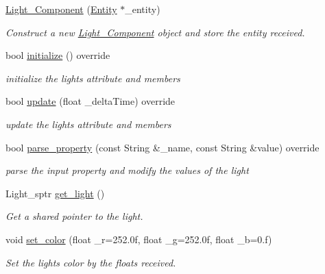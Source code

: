 \begin{DoxyCompactItemize}
\item 
\mbox{\hyperlink{classbanita_1_1_light___component_ab3a24d9ee4cd5d3598588dabef05375b}{Light\+\_\+\+Component}} (\mbox{\hyperlink{classbanita_1_1_entity}{Entity}} $\ast$\+\_\+entity)
\begin{DoxyCompactList}\small\item\em Construct a new \mbox{\hyperlink{classbanita_1_1_light___component}{Light\+\_\+\+Component}} object and store the entity received. \end{DoxyCompactList}\item 
bool \mbox{\hyperlink{classbanita_1_1_light___component_a2afec04726df91aee59837fa1481d361}{initialize}} () override
\begin{DoxyCompactList}\small\item\em initialize the light\textquotesingle{}s attribute and members \end{DoxyCompactList}\item 
bool \mbox{\hyperlink{classbanita_1_1_light___component_a1cba9ef2cb6b798623899ad94f68df9f}{update}} (float \+\_\+delta\+Time) override
\begin{DoxyCompactList}\small\item\em update the light\textquotesingle{}s attribute and members \end{DoxyCompactList}\item 
bool \mbox{\hyperlink{classbanita_1_1_light___component_aa808026256f8f1050a1a90cc3b6a0602}{parse\+\_\+property}} (const String \&\+\_\+name, const String \&value) override
\begin{DoxyCompactList}\small\item\em parse the input property and modify the values of the light \end{DoxyCompactList}\item 
Light\+\_\+sptr \mbox{\hyperlink{classbanita_1_1_light___component_a4de1a5438ce5f15ecd46544bf27b4d6e}{get\+\_\+light}} ()
\begin{DoxyCompactList}\small\item\em Get a shared pointer to the light. \end{DoxyCompactList}\item 
void \mbox{\hyperlink{classbanita_1_1_light___component_a92916e5a6493c735954aec600c1aa77f}{set\+\_\+color}} (float \+\_\+r=252.\+0f, float \+\_\+g=252.\+0f, float \+\_\+b=0.\+f)
\begin{DoxyCompactList}\small\item\em Set the light\textquotesingle{}s color by the floats received. \end{DoxyCompactList}\item 

\end{DoxyCompactItemize}
